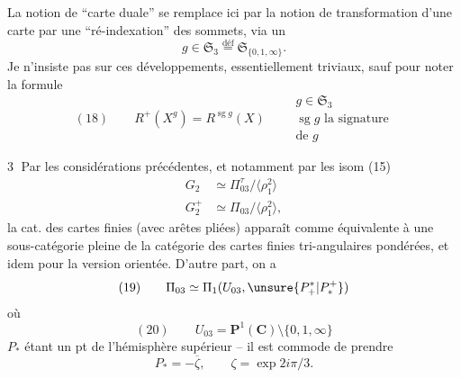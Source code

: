 

La notion de ``carte duale'' se remplace ici par la notion de transformation d'une carte par une ``ré-indexation'' des sommets, via un
\[
g\in\mathfrak S_3\overset{\mathrm{déf}}=\mathfrak S_{\{0,1,\infty\}}.
\]
Je n'insiste pas sur ces développements, essentiellement triviaux, sauf pour noter la formule
\[
(18)\qquad R^+(X^g)=R^{\operatorname{sg}g}(X)
\qquad\begin{array}{l}g\in\mathfrak S_3\\\operatorname{sg}g\text{ la signature}\\\text{de }g\end{array}
\]

\textcircled{3} Par les considérations précédentes, et notamment par les isom (15)
\[
\begin{split}
G_2&\simeq\Pi_{03}^{\tau}/\langle\rho_1^2\rangle\\
G_2^+&\simeq\Pi_{03}/\langle\rho_1^2\rangle,
\end{split}
\]
la cat.  des cartes finies (avec arêtes pliées) apparaît comme équivalente à une sous-catégorie pleine de la catégorie  des cartes finies tri-angulaires pondérées, et idem pour la version orientée. D'autre part, on a
\[
(19)\qquad\Pi_{03}\simeq\Pi_1(U_{03},\unsure{P_+^*|P_*^+})
\]
où 
\[
(20)\qquad U_{03}=\mathbf P^1(\mathbf C)\setminus\{0,1,\infty\}
\]
 $P_*$ étant un pt  de l'hémisphère supérieur -- il est commode de prendre
\[
P_*=-\overline\zeta,\qquad\zeta=\exp 2i\pi/3.
\]


